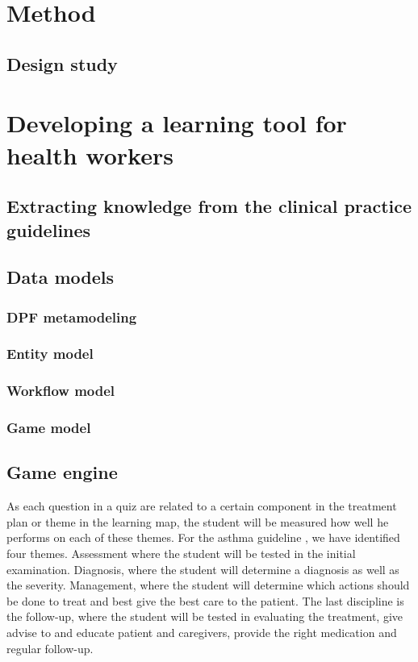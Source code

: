 \documentclass[a4paper,12pt]{book}
\begin{document}
\frontmatter


\tableofcontents
\mainmatter





\chapter{Method}
\section{Design study}






\chapter{Developing a learning tool for health workers}
\section{Extracting knowledge from the clinical  practice guidelines}
\section{Data models}
\subsection{DPF metamodeling}
\subsection{Entity model}
\subsection{Workflow model}
\subsection{Game model}
\section{Game engine}
As each question in a quiz are related to a certain component in the treatment plan or theme in the learning map, the student will be measured how well he performs on each of these themes. For the asthma guideline \parencite{RepublicofKeny2016}, we have identified four themes. Assessment where the student will be tested in the initial examination. Diagnosis, where the student will determine a diagnosis as well as the severity. Management, where the student will determine which actions should be done to treat and best give the best care to the patient. The last discipline is the follow-up, where the student will be tested in evaluating the treatment, give advise to and educate patient and caregivers, provide the right medication and regular follow-up.
\end{document}
